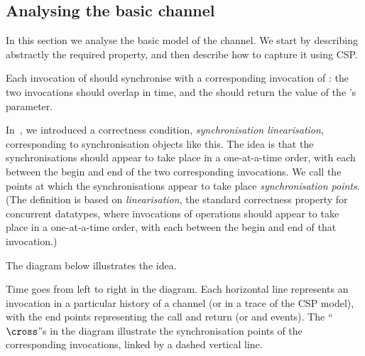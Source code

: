 
\subsection{Analysing the basic channel}


In this section we analyse the basic model of the channel.  We start by
describing abstractly the required property, and then describe how to capture
it using CSP.

Each invocation of  should synchronise with a corresponding
invocation of : the two invocations should overlap in time, and
the  should return the value of the 's parameter.  

In~\cite{LL:synchronisation}, we introduced a correctness condition,
\emph{synchronisation linearisation}, corresponding to synchronisation objects
like this.  The idea is that the synchronisations should appear to take place
in a one-at-a-time order, with each between the begin and end of the two
corresponding invocations.  We call the points at which the synchronisations
appear to take place \emph{synchronisation points}.  (The definition is based
on \emph{linearisation}, the standard correctness property for concurrent
datatypes, where invocations of operations should appear to take place in a
one-at-a-time order, with each between the begin and end of that invocation.)

The diagram below illustrates the idea.
%
\begin{center}
\unScalaMid
{}
\scalaMid
\end{center}
%
Time goes from left to right in the diagram.  Each horizontal line represents
an invocation in a particular history of a channel (or in a trace of the CSP
model), with the end points representing the call and return (or 
and  events).  The ``$\cross$''s in the diagram illustrate the
synchronisation points of the corresponding invocations, linked by a dashed
vertical line.

